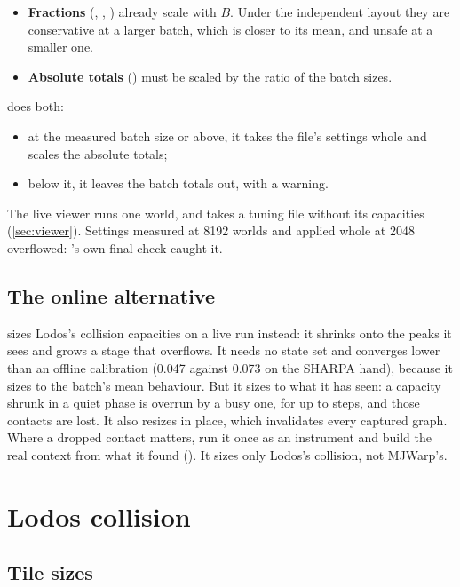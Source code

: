 \begin{itemize}
\item \textbf{Fractions} (, , ) already scale with $B$. Under the independent layout they are conservative at a larger batch, which is closer to its mean, and unsafe at a smaller one.
\item \textbf{Absolute totals} () must be scaled by the ratio of the batch sizes.
\end{itemize}

 does both:

\begin{itemize}
\item at the measured batch size or above, it takes the file's settings whole and scales the absolute totals;
\item below it, it leaves the batch totals out, with a warning.
\end{itemize}

The live viewer runs one world, and takes a tuning file without its capacities (\cref{sec:viewer}). Settings measured at 8192 worlds and applied whole at 2048 overflowed: 's own final check caught it.

\subsection{The online alternative}\label{sec:autosizer}

 sizes Lodos's collision capacities on a live run instead: it shrinks onto the peaks it sees and grows a stage that overflows. It needs no state set and converges lower than an offline calibration (0.047 against 0.073 on the SHARPA hand), because it sizes to the batch's mean behaviour. But it sizes to what it has seen: a capacity shrunk in a quiet phase is overrun by a busy one, for up to  steps, and those contacts are lost. It also resizes in place, which invalidates every captured graph. Where a dropped contact matters, run it once as an instrument and build the real context from what it found (). It sizes only Lodos's collision, not MJWarp's.

\section{Lodos collision}\label{sec:lodos}

\subsection{Tile sizes}\label{sec:tiles}

